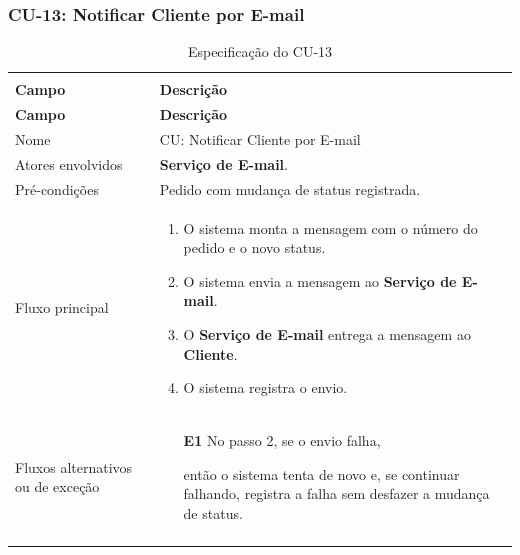 \documentclass[12pt,a4paper]{article}
\begin{document}
\Needspace{200pt}
\subsubsection{CU-13: Notificar Cliente por E-mail}

{\setlength{\arrayrulewidth}{0.3pt}\renewcommand{\arraystretch}{1.1}\small{}
\begin{xltabular}{\textwidth}{>{\raggedright\arraybackslash}p{3.4cm}|>{\raggedright\arraybackslash}X}
\caption{Especificação do CU-13}\\
\toprule{}
\textbf{Campo} & \textbf{Descrição}\\ \midrule{}
\endfirsthead
{}\toprule{}
\textbf{Campo} & \textbf{Descrição}\\ \midrule{}
\endhead
\endlastfoot
Nome & CU: Notificar Cliente por E-mail\\ \hline
Atores envolvidos & \textbf{Serviço de E-mail}.\\ \hline
Pré-condições & Pedido com mudança de status registrada.\\ \hline
Fluxo principal & \begin{enumerate}[nosep,leftmargin=1.4em,label=\arabic*.,before=\vspace{-\baselineskip},after=\vspace{-0.4\baselineskip}]\item O sistema monta a mensagem com o número do pedido e o novo status. \item O sistema envia a mensagem ao \textbf{Serviço de E-mail}. \item O \textbf{Serviço de E-mail} entrega a mensagem ao \textbf{Cliente}. \item O sistema registra o envio. \end{enumerate}\\ \hline
Fluxos alternativos ou de exceção & \begin{itemize}[nosep,leftmargin=2.2em,labelwidth=2.2em,labelsep=0pt,align=left,itemsep=4pt,before=\vspace{-\baselineskip},after=\vspace{-0.4\baselineskip}]\item[\textbf{E1}] No passo 2, se o envio falha,\par então o sistema tenta de novo e, se continuar falhando, registra a falha sem desfazer a mudança de status.\end{itemize}\\ \bottomrule
\end{xltabular}}
\end{document}
